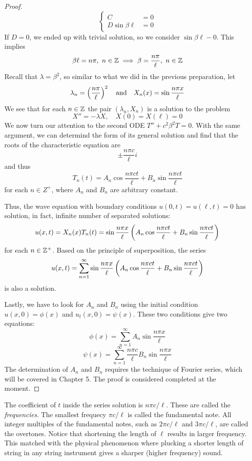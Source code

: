 \begin{proof}
    \[\begin{cases}
        C &= 0\\
        D\sin\beta\ell &= 0
    \end{cases}\]
    If $D=0$, we ended up with trivial solution, so we consider $\sin \beta\ell - 0$. This implies 
    \[\beta\ell = n\pi, \ n\in {\mathbb Z} \implies \beta = \frac{n\pi }{\ell},\ n\in {\mathbb Z}\]
    Recall that $\lambda = \beta^2$, so similar to what we did in the previous preparation, let 
    \[\lambda_n = \left(\frac{n\pi}{\ell}\right)^2 \quad \text{and} \quad X_n(x) = \sin\frac{n\pi x}{\ell}\]
    We see that for each $n\in {\mathbb Z}$ the pair $(\lambda_n, X_n)$ is a solution to the problem 
    \[X'' = -\lambda X, \quad X(0) = X(\ell) = 0\]
    We now turn our attention to the second ODE $T'' + c^2 \beta^2 T = 0$. With the same argument, we can determind the form of its general solution and find that the roots of the characteristic equation are
    \[\pm \frac{n\pi c}{\ell} i\]
    and thus 
    \[T_n(t) = A_n \cos \frac{n\pi ct}{\ell} + B_n \sin \frac{n\pi ct}{\ell}\]
    for each $n\in Z^+$, where $A_n$ and $B_n$ are arbitrary constant.

    Thus, the wave equation with boundary conditions $u(0,t) = u(\ell, t) = 0$ has solution, in fact, infinite number of separated solutions:
    \[u(x,t) = X_n(x)T_n(t) = \sin\frac{n\pi x}{\ell}\left(A_n \cos \frac{n\pi ct}{\ell} + B_n \sin \frac{n\pi ct}{\ell}\right) \]
    for each $n\in {\mathbb Z}^+$. Based on the principle of superposition, the series
    \[u(x,t) = \sum_{n=1}^\infty \sin\frac{n\pi x}{\ell}\left(A_n \cos \frac{n\pi ct}{\ell} + B_n \sin \frac{n\pi ct}{\ell}\right) \]
    is also a solution.

    Lastly, we have to look for $A_n$ and $B_n$ using the initial condition $u(x,0) = \phi(x)$ and $u_t(x,0)  =\psi(x)$. These two conditions give two equations:
    \[\phi(x) = \sum_{n=1}^{\infty} A_n \sin \frac{n\pi x}{\ell}\]
    \[\psi(x) = \sum_{n=1}^{\infty} \frac{n\pi c}{\ell} B_n \sin\frac{n\pi x}{\ell}\]
    The determination of $A_n$ and $B_n$ requires the technique of Fourier series, which will be covered in Chapter 5. The proof is considered completed at the moment.
\end{proof}

\begin{re} 
    The coefficient of $t$ inside the series solution is $n\pi c/\ell$. These are called the \emph{frequencies}. The smallest frequecy $\pi c/\ell$ is called the fundamental note. All integer multiples of the fundamental notes, such as $2\pi c/\ell$ and $3 \pi c/\ell$, are called the overtones. Notice that shortening the length of $\ell$ results in larger frequency. This matched with the physical phenomenon where plucking a shorter length of string in any string instrument gives a sharper (higher frequency) sound.
\end{re}

